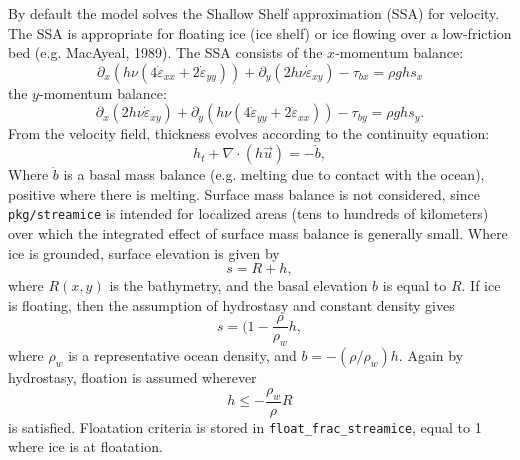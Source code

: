 By default the model solves the Shallow Shelf approximation (SSA) for velocity.
The SSA is appropriate for floating ice (ice shelf) or ice flowing over a
low-friction bed (e.g. MacAyeal, 1989). The SSA consists of the $x$-momentum
balance:
\begin{equation}
\label{eq:xmom}
 \partial_x(h\nu(4\dot{\varepsilon}_{xx}+2\dot{\varepsilon}_{yy})) +
\partial_y(2h\nu\dot{\varepsilon}_{xy}) - \tau_{bx} = \rho g h s_x 
\end{equation}
the $y$-momentum balance:
\begin{equation}
\label{eq:ymom}
 \partial_x(2h\nu\dot{\varepsilon}_{xy}) +
\partial_y(h\nu(4\dot{\varepsilon}_{yy}+2\dot{\varepsilon}_{xx})) - \tau_{by} =
\rho g h s_y.
\end{equation}
From the velocity field, thickness evolves according to the continuity equation:
\begin{equation}
\label{eq:cont}
 h_t + \nabla\cdot(h\vec{u}) = -\dot{b},
\end{equation}
Where $\dot{b}$ is a basal mass balance (e.g. melting due to contact with the
ocean), positive where there is melting. Surface mass balance is not considered,
since {\tt pkg/streamice} is intended for localized areas (tens to hundreds of
kilometers) over which the integrated effect of surface mass balance is
generally small. Where ice is grounded, surface elevation is given by 
\begin{equation}
 s = R + h,
\end{equation}
where $R(x,y)$ is the bathymetry, and the basal elevation $b$ is equal to $R$.
If ice is floating, then the assumption of hydrostasy and constant density gives
\begin{equation}
 s = (1-\frac{\rho}{\rho_w} h,
\end{equation}
where $\rho_w$ is a representative ocean density, and $b=-(\rho/\rho_w)h$. Again
by hydrostasy, floation is assumed wherever
\begin{equation}
 h \leq -\frac{\rho_w}{\rho}R
\end{equation}
is satisfied. Floatation criteria is stored in \texttt{float\_frac\_streamice}, equal to 1 where ice is at floatation.

